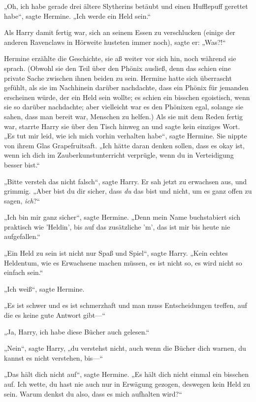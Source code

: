 {„Oh, ich habe gerade drei ältere Slytherins betäubt und einen Hufflepuff gerettet habe“, sagte Hermine. „Ich werde ein Held sein.“

Als Harry damit fertig war, sich an seinem Essen zu verschlucken (einige der anderen Ravenclaws in Hörweite husteten immer noch), sagte er: „Was?!“

Hermine erzählte die Geschichte, sie aß weiter vor sich hin, noch während sie sprach. (Obwohl sie den Teil über den Phönix ausließ, denn das schien eine private Sache zwischen ihnen beiden zu sein. Hermine hatte sich überrascht gefühlt, als sie im Nachhinein darüber nachdachte, dass ein Phönix für jemanden erscheinen würde, der ein Held sein wollte; es schien ein bisschen egoistisch, wenn sie so darüber nachdachte; aber vielleicht war es den Phönixen egal, solange sie sahen, dass man bereit war, Menschen zu helfen.) Als sie mit dem Reden fertig war, starrte Harry sie über den Tisch hinweg an und sagte kein einziges Wort. „Es tut mir leid, wie ich mich vorhin verhalten habe“, sagte Hermine. Sie nippte von ihrem Glas Grapefruitsaft. „Ich hätte daran denken sollen, dass es okay ist, wenn ich dich im Zauberkunstunterricht verprügle, wenn du in Verteidigung besser bist.“

„Bitte versteh das nicht falsch“, sagte Harry. Er sah jetzt zu erwachsen aus, und grimmig. „Aber bist du dir sicher, dass \emph{du} das bist und nicht, um es ganz offen zu sagen, \emph{ich}?“

„Ich bin mir ganz sicher“, sagte Hermine. „Denn mein Name buchstabiert sich praktisch wie 'Heldin', bis auf das zusätzliche 'm', das ist mir bis heute nie aufgefallen.“

„Ein Held zu sein ist nicht nur Spaß und Spiel“, sagte Harry. „Kein echtes Heldentum, wie es Erwachsene machen müssen, es ist nicht so, es wird nicht so einfach sein.“

„Ich weiß“, sagte Hermine.

„Es ist schwer und es ist schmerzhaft und man muss Entscheidungen treffen, auf die es keine gute Antwort gibt—“

„Ja, Harry, ich habe diese Bücher auch gelesen.“

„Nein“, sagte Harry, „du verstehst nicht, auch wenn die Bücher dich warnen, du kannst es nicht verstehen, bis—“

„Das hält dich nicht auf“, sagte Hermine. „Es hält dich nicht einmal ein bisschen auf. Ich wette, du hast nie auch nur in Erwägung gezogen, deswegen kein Held zu sein. Warum denkst du also, dass es mich aufhalten wird?“

}
